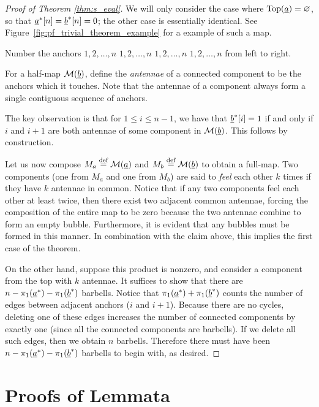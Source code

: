 \begin{proof}[Proof of Theorem \ref{thm:s_eval}]
	We will only consider the case where $\operatorname{Top}(\underline{a}) = \varnothing$, so that $\underline{a}^\ast[n] = \underline{b}^\ast[n] = 0$; the other case is essentially identical.  See Figure~\ref{fig:pf_trivial_theorem_example} for a example of such a map.

	Number the anchors $1,2,\dots,n$ $1,2,\dots,n$ $1,2,\dots,n$ $1,2,\dots,n$ from left to right.

	For a half-map $\mathcal M(\underline{b})$, define the \emph{antennae} of a connected component to be the anchors which it touches.  Note that the antennae of a component always form a single contiguous sequence of anchors.

	The key observation is that for $1 \le i \le n-1$, we have that $\underline{b}^\ast[i] = 1$ if and only if $i$ and $i+1$ are both antennae of some component in $\mathcal M(\underline{b})$.  This follows by construction.

	Let us now compose $M_a \stackrel{\text{def}}{=} \mathcal M(\underline{a})$ and $M_b \stackrel{\text{def}}{=} \mathcal M(\underline{b})$ to obtain a full-map.  Two components (one from $M_a$ and one from $M_b$) are said to \emph{feel} each other $k$ times if they have $k$ antennae in common.  Notice that if any two components feel each other at least twice, then there exist two adjacent common antennae, forcing the composition of the entire map to be zero because the two antennae combine to form an empty bubble.  Furthermore, it is evident that any bubbles must be formed in this manner.  In combination with the claim above, this implies the first case of the theorem.

	On the other hand, suppose this product is nonzero, and consider a component from the top with $k$ antennae.  It suffices to show that there are $n - \pi_1(\underline{a}^\ast) - \pi_1(\underline{b}^\ast)$ barbells.  Notice that $\pi_1(\underline{a}^\ast) + \pi_1(\underline{b}^\ast)$ counts the number of edges between adjacent anchors ($i$ and $i+1$).  Because there are no cycles, deleting one of these edges increases the number of connected components by exactly one (since all the connected components are barbells).  If we delete all such edges, then we obtain $n$ barbells.  Therefore there must have been $n - \pi_1(\underline{a}^\ast) - \pi_1(\underline{b}^\ast)$ barbells to begin with, as desired.
\end{proof}

\section{Proofs of Lemmata}
\label{sec:lemmata_proof}

